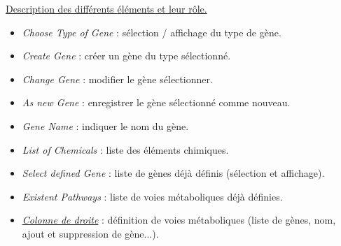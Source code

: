 \documentclass[11pt,twoside,a4paper]{article}
\begin{document}
\underline{Description des diff{\'e}rents {\'e}l{\'e}ments et leur r{\^o}le. }
\begin{itemize}
	\item \emph{Choose Type of Gene} : s{\'e}lection / affichage du type de g{\`e}ne. 
	\item \emph{Create Gene} : cr{\'e}er un g{\`e}ne du type s{\'e}lectionn{\'e}. 
	\item \emph{Change Gene} : modifier le g{\`e}ne s{\'e}lectionner. 
	\item \emph{As new Gene} : enregistrer le g{\`e}ne s{\'e}lectionn{\'e} comme nouveau. 
	\item \emph{Gene Name} : indiquer le nom du g{\`e}ne. 
	\item \emph{List of Chemicals} : liste des {\'e}l{\'e}ments chimiques. 
	\item \emph{Select defined Gene} : liste de g{\`e}nes d{\'e}j{\`a} d{\'e}finis (s{\'e}lection et affichage). 
	\item \emph{Existent Pathways} : liste de voies m{\'e}taboliques d{\'e}j{\`a} d{\'e}finies. 
	\item \emph{\underline{Colonne de droite}} : d{\'e}finition de voies m{\'e}taboliques (liste de g{\`e}nes, nom, ajout et suppression de g{\`e}ne...). 
\end{itemize}~\\
\end{document}
